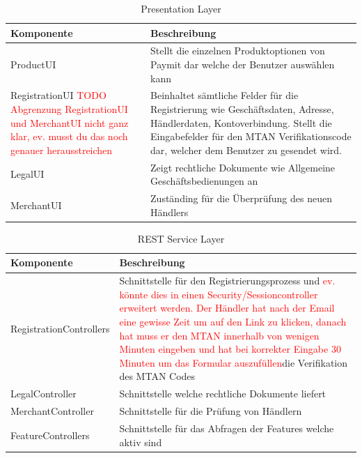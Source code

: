 \begin{table}[H]
	\centering
	\caption{Presentation Layer}
	\begin{tabular}{ | p{4cm} | p{11cm} | }
		\toprule
		{\textbf{Komponente}} & {\textbf{Beschreibung}} \\
		\midrule
		ProductUI &  Stellt die einzelnen Produktoptionen von Paymit dar welche der Benutzer auswählen kann\\ \hline
		RegistrationUI \textcolor{red}{TODO Abgrenzung RegistrationUI und MerchantUI nicht ganz klar, ev. musst du das noch genauer herausstreichen} &  Beinhaltet sämtliche Felder für die Registrierung wie Geschäftsdaten, Adresse, Händlerdaten, Kontoverbindung. Stellt die Eingabefelder für den MTAN Verifikationscode dar, welcher dem Benutzer zu gesendet wird.\\ \hline
		LegalUI &  Zeigt rechtliche Dokumente wie Allgemeine Geschäftsbedienungen an \\ \hline
		MerchantUI &  Zuständing für die Überprüfung des neuen Händlers\\
		\bottomrule
	\end{tabular}
\end{table}

\begin{table}[H]
	\centering
	\caption{REST Service Layer}
	\begin{tabular}{ | p{4cm} | p{11cm} | }
		\toprule
		{\textbf{Komponente}} & {\textbf{Beschreibung}} \\
		\midrule
		RegistrationControllers &  Schnittstelle für den Registrierungsprozess und \textcolor{red}{ev. könnte dies in einen Security/Sessioncontroller erweitert werden. Der Händler hat nach der Email eine gewisse Zeit um auf den Link zu klicken, danach hat muss er den MTAN innerhalb von wenigen Minuten eingeben und hat bei korrekter Eingabe 30 Minuten um das Formular auszufüllen}die Verifikation des MTAN Codes \\ \hline
		LegalController &  Schnittstelle welche rechtliche Dokumente liefert \\ \hline
		MerchantController &  Schnittstelle für die Prüfung von Händlern \\ \hline
		FeatureControllers& Schnittstelle für das Abfragen der Features welche aktiv sind \\
		\bottomrule
	\end{tabular}
\end{table}

